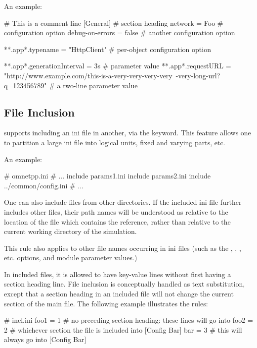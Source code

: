 An example:

\begin{inifile}
# This is a comment line
[General]                       # section heading
network = Foo                   # configuration option
debug-on-errors = false         # another configuration option

**.app*.typename = "HttpClient" # per-object configuration option

**.app*.generationInterval = 3s # parameter value
**.app*.requestURL = "http://www.example.com/this-is-a-very-very-very-very\
-very-long-url?q=123456789"     # a two-line parameter value
\end{inifile}

\subsection{File Inclusion}
\label{sec:config-sim:inifile-inclusion}

{\opp} supports including an ini file in another,
via the \ttt{include} keyword. This feature allows one to partition a large ini
file into logical units, fixed and varying parts, etc.

An example:

\begin{inifile}
# omnetpp.ini
# ...
include params1.ini
include params2.ini
include ../common/config.ini
# ...
\end{inifile}

One can also include files from other directories. If the included ini file
further includes other files, their path names will be understood as relative to
the location of the file which contains the reference, rather than relative
to the current working directory of the simulation.

This rule also applies to other file names occurring in ini files (such as
the \fconfig{load-libs}, \fconfig{output-vector-file},
, etc. options, and  module
parameter values.)

In included files, it is allowed to have key-value lines without first having a
section heading line. File inclusion is conceptually handled as text
substitution, except that a section heading in an included file will not
change the current section of the main file. The following example illustrates
the rules:

\begin{inifile}
# incl.ini
foo1 = 1          # no preceding section heading: these lines will go into
foo2 = 2          # whichever section the file is included into
[Config Bar]
bar = 3           # this will always go into [Config Bar]
\end{inifile}

